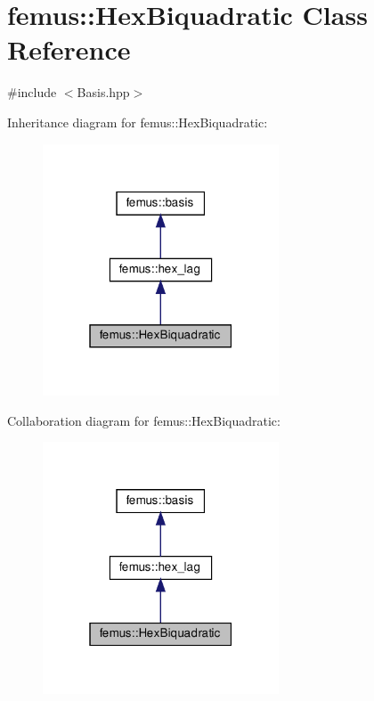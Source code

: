 \hypertarget{classfemus_1_1_hex_biquadratic}{}\section{femus\+:\+:Hex\+Biquadratic Class Reference}
\label{classfemus_1_1_hex_biquadratic}


{\ttfamily \#include $<$Basis.\+hpp$>$}



Inheritance diagram for femus\+:\+:Hex\+Biquadratic\+:
\nopagebreak
\begin{figure}[H]
\begin{center}
\leavevmode
\includegraphics[width=199pt]{classfemus_1_1_hex_biquadratic__inherit__graph}
\end{center}
\end{figure}


Collaboration diagram for femus\+:\+:Hex\+Biquadratic\+:
\nopagebreak
\begin{figure}[H]
\begin{center}
\leavevmode
\includegraphics[width=199pt]{classfemus_1_1_hex_biquadratic__coll__graph}
\end{center}
\end{figure}
